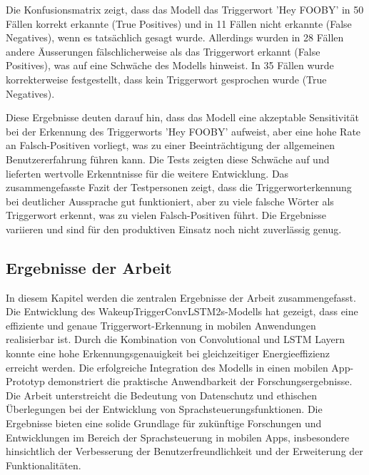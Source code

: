 \documentclass[11pt,a4paper]{article}
\begin{document}
\noindent \newline
Die Konfusionsmatrix zeigt, dass das Modell das Triggerwort 'Hey FOOBY' in 50 Fällen korrekt 
erkannte (True Positives) und in 11 Fällen nicht erkannte (False Negatives), wenn es tatsächlich 
gesagt wurde. Allerdings wurden in 28 Fällen andere Äusserungen fälschlicherweise als das 
Triggerwort erkannt (False Positives), was auf eine Schwäche des Modells hinweist. In 35 Fällen 
wurde korrekterweise festgestellt, dass kein Triggerwort gesprochen wurde (True Negatives).

\noindent \newline
Diese Ergebnisse deuten darauf hin, dass das Modell eine akzeptable Sensitivität bei der Erkennung 
des Triggerworts 'Hey FOOBY' aufweist, aber eine hohe Rate an Falsch-Positiven vorliegt, was zu 
einer Beeinträchtigung der allgemeinen Benutzererfahrung führen kann. Die Tests zeigten diese 
Schwäche auf und lieferten wertvolle Erkenntnisse für die weitere Entwicklung. 
Das zusammengefasste Fazit der Testpersonen zeigt, dass die Triggerworterkennung bei deutlicher 
Aussprache 
gut funktioniert, aber zu viele falsche Wörter als Triggerwort erkennt, was zu vielen 
Falsch-Positiven führt. Die Ergebnisse variieren und sind für den produktiven Einsatz noch nicht 
zuverlässig genug.

\subsection{Ergebnisse der Arbeit}
In diesem Kapitel werden die zentralen Ergebnisse der Arbeit zusammengefasst. Die Entwicklung des 
WakeupTriggerConvLSTM2s-Modells hat gezeigt, dass eine effiziente und genaue Triggerwort-Erkennung 
in mobilen Anwendungen realisierbar ist. Durch die Kombination von Convolutional und LSTM Layern 
konnte eine hohe Erkennungsgenauigkeit bei gleichzeitiger Energieeffizienz erreicht werden. Die 
erfolgreiche Integration des Modells in einen mobilen App-Prototyp demonstriert die praktische 
Anwendbarkeit der Forschungsergebnisse. Die Arbeit unterstreicht die Bedeutung von Datenschutz und 
ethischen Überlegungen bei der Entwicklung von Sprachsteuerungsfunktionen. Die Ergebnisse bieten 
eine solide Grundlage für zukünftige Forschungen und Entwicklungen im Bereich der Sprachsteuerung 
in mobilen Apps, insbesondere hinsichtlich der Verbesserung der Benutzerfreundlichkeit und der 
Erweiterung der Funktionalitäten.
\end{document}

